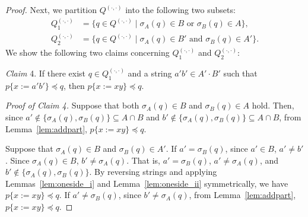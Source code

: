 \begin{proof}
Next, we partition $Q^{(\cdot,\cdot)}$ into the following two subsets:
\begin{align*}
  Q_{1}^{(\cdot,\cdot)} & = \{q \in Q^{(\cdot,\cdot)} \mid \sigma_{A}(q) \in B \mbox{ or } \sigma_{B}(q) \in A\},\\
  Q_{2}^{(\cdot,\cdot)} & = \{q \in Q^{(\cdot,\cdot)} \mid \sigma_{A}(q) \in B' \mbox{ and } \sigma_{B}(q) \in A'\}.
\end{align*}
We show the {\color{black}following} two claims {\color{black}concerning} $Q_{1}^{(\cdot,\cdot)}$ and $Q_{2}^{(\cdot,\cdot)}$:

\smallskip

\noindent
\textit{Claim} 4.
If there exist $q \in Q_{1}^{(\cdot,\cdot)}$ and a string $a'b' \in A'\cdot B'$ such that $p\{x:=a'b'\} \preceq q$, then $p\{x:=xy\} \preceq q$.

\smallskip

%
{\color{red}
\noindent
\textit{Proof of Claim 4.}
Suppose that both $\sigma_A(q) \in B$ and $\sigma_B(q) \in A$ hold. Then, since $a' \notin \{\sigma_A(q), \sigma_B(q)\} \subseteq A \cap B$ and $b' \notin \{\sigma_A(q), \sigma_B(q)\} \subseteq A \cap B$, from Lemma~\ref{lem:addpart}, $p\{x := xy\} \preceq q$.

Suppose that $\sigma_A(q) \in B$ and $\sigma_B(q) \in A'$. If $a' = \sigma_B(q)$, since $a' \in B$, $a' \ne b'$. Since $\sigma_A(q) \in B$, $b' \ne \sigma_A(q)$. That is, $a' = \sigma_B(q)$, $a' \ne \sigma_A(q)$, and $b' \notin \{\sigma_A(q), \sigma_B(q)\}$. By reversing strings and applying Lemmas~\ref{lem:oneside_i} and Lemma~\ref{lem:oneside_ii} symmetrically, we have $p\{x := xy\} \preceq q$. If $a' \ne \sigma_B(q)$, since $b' \ne \sigma_A(q)$, from Lemma~\ref{lem:addpart}, $p\{x := xy\} \preceq q$.

}
\end{proof}

